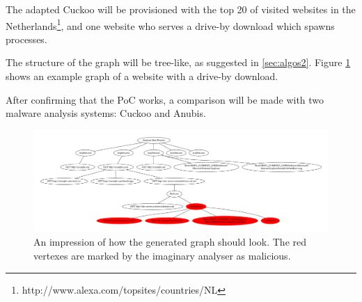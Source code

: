 The adapted Cuckoo will be provisioned with the top 20 of visited websites in the Netherlands\footnote{http://www.alexa.com/topsites/countries/NL}, and one website who serves a drive-by download which spawns processes.

The structure of the graph will be tree-like, as suggested in \ref{sec:algos2}. Figure \ref{fig:alg_tree} shows an example graph of a website with a drive-by download.

After confirming that the PoC works, a comparison will be made with two malware analysis systems: Cuckoo and Anubis.

\pagebreak

\begin{figure}[h]
    \centering
    \centerline{\includegraphics[width=25cm,angle=90]{Images/alg_tree}}
    \caption{An impression of how the generated graph should look. The red vertexes are marked by the imaginary analyser as malicious.}
    \label{fig:alg_tree}
\end{figure}

\pagebreak

\restoregeometry
{}
\setcounter{page}{\thesavepage}

